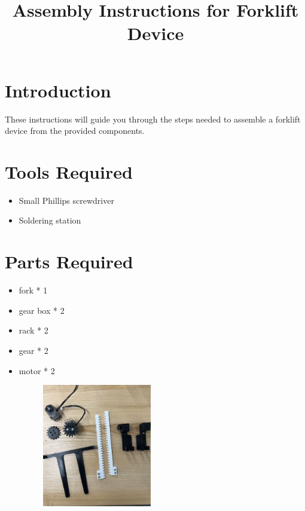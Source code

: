 \documentclass{article}
\begin{document}
\title{Assembly Instructions for Forklift Device}
\author{}
\date{}

\maketitle

\section{Introduction}
These instructions will guide you through the steps needed to assemble a forklift device from the provided components.

\section{Tools Required}
\begin{itemize}
    \item Small Phillips screwdriver
    \item Soldering station
\end{itemize}

\section{Parts Required}
\begin{itemize}
    \item fork * 1
    \item gear box * 2
    \item rack * 2
    \item gear * 2
    \item motor * 2

    \begin{figure}[H]
        \centering
        \includegraphics[width=0.45\textwidth]{2.jpg}
        \captionsetup{justification=centering}
        \caption{}
    \end{figure}    

\end{itemize}
\end{document}
